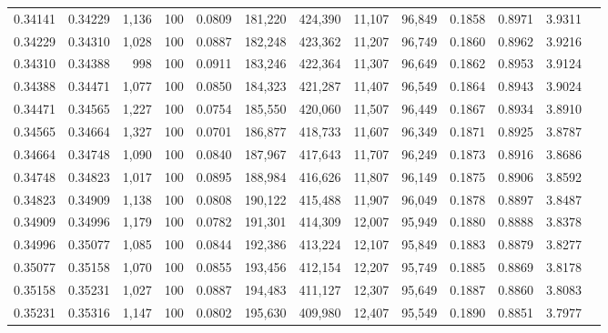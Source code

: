 \begin{tabular}{rrrrrrrrrrrrr}
0.34141 & 0.34229 & 1,136 & 100 &                                     0.0809 & 181,220 & 424,390 &  11,107 &  96,849 & 0.1858 & 0.8971 & 3.9311 \\
0.34229 & 0.34310 & 1,028 & 100 &                                     0.0887 & 182,248 & 423,362 &  11,207 &  96,749 & 0.1860 & 0.8962 & 3.9216 \\
0.34310 & 0.34388 &   998 & 100 &                                     0.0911 & 183,246 & 422,364 &  11,307 &  96,649 & 0.1862 & 0.8953 & 3.9124 \\
0.34388 & 0.34471 & 1,077 & 100 &                                     0.0850 & 184,323 & 421,287 &  11,407 &  96,549 & 0.1864 & 0.8943 & 3.9024 \\
0.34471 & 0.34565 & 1,227 & 100 &                                     0.0754 & 185,550 & 420,060 &  11,507 &  96,449 & 0.1867 & 0.8934 & 3.8910 \\
0.34565 & 0.34664 & 1,327 & 100 &                                     0.0701 & 186,877 & 418,733 &  11,607 &  96,349 & 0.1871 & 0.8925 & 3.8787 \\
0.34664 & 0.34748 & 1,090 & 100 &                                     0.0840 & 187,967 & 417,643 &  11,707 &  96,249 & 0.1873 & 0.8916 & 3.8686 \\
0.34748 & 0.34823 & 1,017 & 100 &                                     0.0895 & 188,984 & 416,626 &  11,807 &  96,149 & 0.1875 & 0.8906 & 3.8592 \\
0.34823 & 0.34909 & 1,138 & 100 &                                     0.0808 & 190,122 & 415,488 &  11,907 &  96,049 & 0.1878 & 0.8897 & 3.8487 \\
0.34909 & 0.34996 & 1,179 & 100 &                                     0.0782 & 191,301 & 414,309 &  12,007 &  95,949 & 0.1880 & 0.8888 & 3.8378 \\
0.34996 & 0.35077 & 1,085 & 100 &                                     0.0844 & 192,386 & 413,224 &  12,107 &  95,849 & 0.1883 & 0.8879 & 3.8277 \\
0.35077 & 0.35158 & 1,070 & 100 &                                     0.0855 & 193,456 & 412,154 &  12,207 &  95,749 & 0.1885 & 0.8869 & 3.8178 \\
0.35158 & 0.35231 & 1,027 & 100 &                                     0.0887 & 194,483 & 411,127 &  12,307 &  95,649 & 0.1887 & 0.8860 & 3.8083 \\
0.35231 & 0.35316 & 1,147 & 100 &                                     0.0802 & 195,630 & 409,980 &  12,407 &  95,549 & 0.1890 & 0.8851 & 3.7977 \\

\end{tabular}
